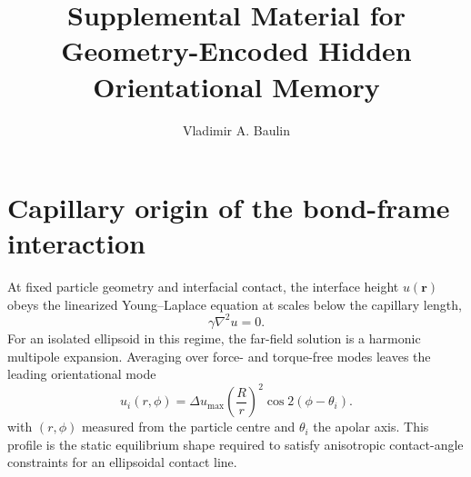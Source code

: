 \documentclass[aps,prl,onecolumn,superscriptaddress,nofootinbib]{revtex4-2}
\begin{document}
\renewcommand{\thefigure}{S\arabic{figure}}
\renewcommand{\thetable}{S\Roman{table}}

\title{Supplemental Material for Geometry-Encoded Hidden Orientational Memory}

\author{Vladimir A. Baulin}

\maketitle

\section{Capillary origin of the bond-frame interaction}

At fixed particle geometry and interfacial contact, the interface height
\(u(\bm r)\) obeys the linearized Young--Laplace equation at scales below the
capillary length,
\begin{equation}
 \gamma\nabla^2 u=0.
 \label{eq:supp-young-laplace}
\end{equation}
For an isolated ellipsoid in this regime, the far-field solution is a harmonic
multipole expansion.
Averaging over force- and torque-free modes leaves the leading orientational mode
\begin{equation}
u_i(r,\phi)=\Delta u_{\max}\left(\frac{R}{r}\right)^2\cos2(\phi-\theta_i).
\end{equation}
with \((r,\phi)\) measured from the particle centre and \(\theta_i\) the
apolar axis.  This profile is the static equilibrium shape required to satisfy
anisotropic contact-angle constraints for an ellipsoidal contact line.
\end{document}
